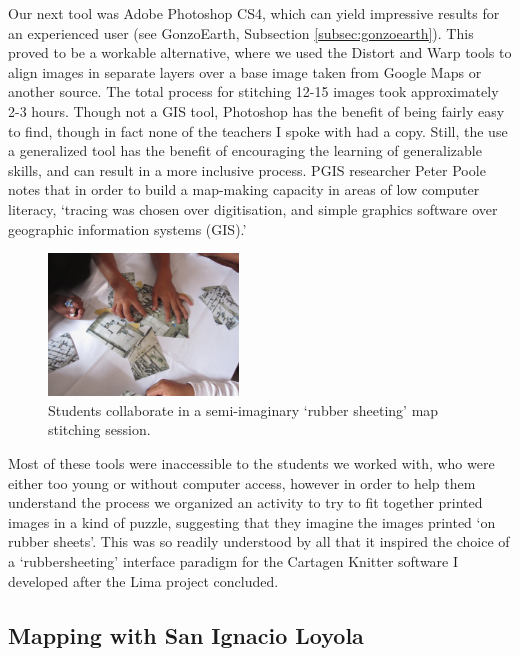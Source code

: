 \documentclass[11pt]{report}
\begin{document}
Our next tool was Adobe Photoshop CS4, which can yield impressive results for an experienced user (see GonzoEarth, Subsection \ref{subsec:gonzoearth}). This proved to be a workable alternative, where we used the Distort and Warp tools to align images in separate layers over a base image taken from Google Maps or another source. The total process for stitching 12-15 images took approximately 2-3 hours. Though not a GIS tool, Photoshop has the benefit of being fairly easy to find, though in fact none of the teachers I spoke with had a copy. Still, the use a generalized tool has the benefit of encouraging the learning of generalizable skills, and can result in a more inclusive process. PGIS researcher Peter Poole notes that in order to build a map-making capacity in areas of low computer literacy, `tracing was chosen over digitisation, and simple graphics software over geographic information systems (GIS).' \cite{poole2006there}

\begin{figure}
	\begin{flushright}
		\includegraphics[width=0.45\textwidth]{images/juan-pablo-rubbersheeting.jpg}
		\caption{Students collaborate in a semi-imaginary `rubber sheeting' map stitching session.}
	\end{flushright}
\end{figure}

Most of these tools were inaccessible to the students we worked with, who were either too young or without computer access, however in order to help them understand the process we organized an activity to try to fit together printed images in a kind of puzzle, suggesting that they imagine the images printed `on rubber sheets'. This was so readily understood by all that it inspired the choice of a `rubbersheeting' interface paradigm for the Cartagen Knitter software I developed after the Lima project concluded. 

\subsection{Mapping with San Ignacio Loyola}
\end{document}
